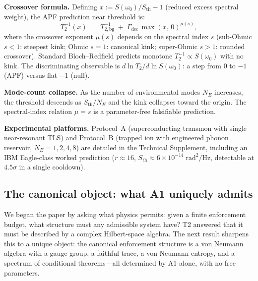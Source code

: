 \documentclass[11pt]{article}
\theoremstyle{remark}
\begin{document}
\medskip\noindent\textbf{Crossover formula.}\label{box:experimental_protocol}  Defining $x := S(\omega_0)/S_{\mathrm{th}} - 1$ (reduced excess spectral weight), the APF prediction near threshold is:
\begin{equation}\label{eq:crossover}
T_2^{-1}(x) \;=\; T_{2,\mathrm{bg}}^{-1} \;+\; \Gamma_{\mathrm{dec}}\, \max(x,\, 0)^{\mu(s)},
\end{equation}
where the crossover exponent $\mu(s)$ depends on the spectral index $s$ (sub-Ohmic $s < 1$: steepest kink; Ohmic $s = 1$: canonical kink; super-Ohmic $s > 1$: rounded crossover).  Standard Bloch--Redfield predicts monotone $T_2^{-1} \propto S(\omega_0)$ with no kink.  The discriminating observable is $d\ln T_2/d\ln S(\omega_0)$: a step from $0$ to $-1$ (APF) versus flat $-1$ (null).

\smallskip\noindent\textbf{Mode-count collapse.}  As the number of environmental modes $N_E$ increases, the threshold descends as $S_{\mathrm{th}}/N_E$ and the kink collapses toward the origin.  The spectral-index relation $\mu = s$ is a parameter-free falsifiable prediction.

\smallskip\noindent\textbf{Experimental platforms.}  Protocol~A (superconducting transmon with single near-resonant TLS) and Protocol~B (trapped ion with engineered phonon reservoir, $N_E = 1, 2, 4, 8$) are detailed in the Technical Supplement, including an IBM Eagle-class worked prediction ($r \approx 16$, $S_{\mathrm{th}} \approx 6 \times 10^{-14}\;\mathrm{rad}^2/\mathrm{Hz}$, detectable at $4.5\sigma$ in a single cooldown).


\subsection{The canonical object: what A1 uniquely admits}
\label{sec:canonical}

\noindent We began the paper by asking what physics permits: given a finite enforcement budget, what structure must any admissible system have?  T2 answered that it must be described by a complex Hilbert-space algebra.  The next result sharpens this to a unique object: the canonical enforcement structure is a von Neumann algebra with a gauge group, a faithful trace, a von Neumann entropy, and a spectrum of conditional theorems---all determined by A1 alone, with no free parameters.
\end{document}

